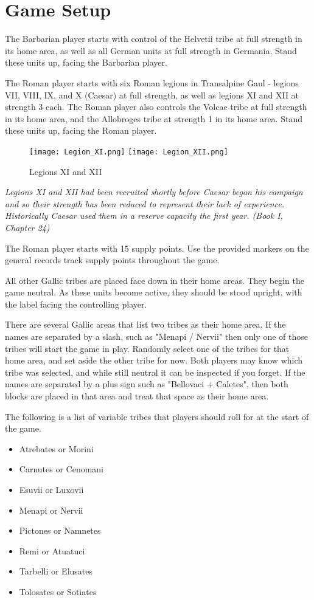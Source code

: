 \section{Game Setup}

The Barbarian player starts with control of the Helvetii tribe at full strength in its home area, as well as all German units at full strength in Germania. Stand these units up, facing the Barbarian player.

The Roman player starts with six Roman legions in Transalpine Gaul - legions VII, VIII, IX, and X (Caesar) at full strength, as well as legions XI and XII at strength 3 each. The Roman player also controls the Volcae tribe at full strength in its home area, and the Allobroges tribe at strength 1 in its home area. Stand these units up, facing the Roman player.

\begin{figure}[h]
  \centering
  \texttt{[image: Legion\_XI.png]}
  \hspace{10mm}
  \texttt{[image: Legion\_XII.png]}
  \caption*{Legions XI and XII}
\end{figure}

\textit{Legions XI and XII had been recruited shortly before Caesar began his campaign and so their strength has been reduced to represent their lack of experience. Historically Caesar used them in a reserve capacity the first year. (Book I, Chapter 24)}

The Roman player starts with 15 supply points. Use the provided markers on the general records track supply points throughout the game.

All other Gallic tribes are placed face down in their home areas. They begin the game neutral. As these units become active, they should be stood upright, with the label facing the controlling player.

There are several Gallic areas that list two tribes as their home area. If the names are separated by a slash, such as "Menapi / Nervii" then only one of those tribes will start the game in play. Randomly select one of the tribes for that home area, and set aside the other tribe for now. Both players may know which tribe was selected, and while still neutral it can be inspected if you forget. If the names are separated by a plus sign such as "Bellovaci + Caletes", then both blocks are placed in that area and treat that space as their home area.

The following is a list of variable tribes that players should roll for at the start of the game.

\begin{itemize}[nosep]
  \item Atrebates or Morini
  \item Carnutes or Cenomani
  \item Esuvii or Luxovii
  \item Menapi or Nervii
  \item Pictones or Namnetes
  \item Remi or Atuatuci
  \item Tarbelli or Elusates
  \item Tolosates or Sotiates
\end{itemize}